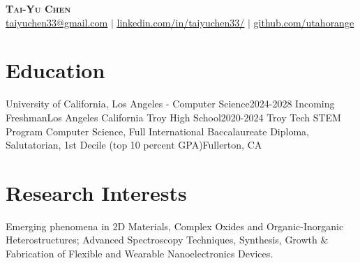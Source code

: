 \documentclass[letterpaper,20pt]{article}
\begin{document}
\begin{center}
    \textbf{\Huge \scshape Tai-Yu Chen} \\ \vspace{1pt}
    \href{mailto:taiyuchen33@gmail.com}{\underline{taiyuchen33@gmail.com}} $|$ 
    \href{https://www.linkedin.com/in/taiyuchen33/}{\underline{linkedin.com/in/taiyuchen33/}} $|$
    \href{https://github.com/utahorange}{\underline{github.com/utahorange}}
\end{center}





\section{Education}
  \resumeSubHeadingListStart
    \resumeSubheading
      {University of California, Los Angeles - Computer Science}{2024-2028}
      {Incoming Freshman}{Los Angeles California}
  \resumeSubHeadingListEnd
  \resumeSubHeadingListStart
    \resumeSubheading
      {Troy High School}{2020-2024}
      {Troy Tech STEM Program Computer Science, Full International Baccalaureate Diploma, Salutatorian, 1st Decile (top 10 percent GPA)}{Fullerton, CA}
  \resumeSubHeadingListEnd


\vspace{0pt}
\section{Research Interests}
	Emerging phenomena in 2D Materials, Complex Oxides and Organic-Inorganic Heterostructures; Advanced Spectroscopy Techniques, Synthesis, Growth $\&$ Fabrication of Flexible and Wearable Nanoelectronics Devices.\\

\vspace{0pt}
\end{document}
